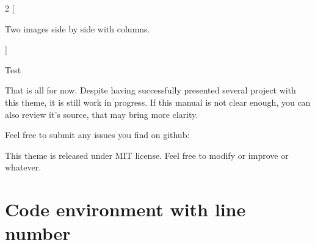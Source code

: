 \documentclass[aspectratio=1610,dvipsnames, noamsthm]{beamer}
\begin{document}
\usePrimaryDeepPurple
\useAccentYellow


\begin{frame}
  \begin{multicols}{2}
    [
      \begin{cardTiny}
        Two images side by side with columns.
      \end{cardTiny}
    ]
    \centering

  \end{multicols}
\end{frame}







\usePrimaryGrey
\useAccentDeepPurple


\begin{frame}{Test}
  \begin{card}
    That is all for now. Despite having successfully presented several project with this theme, it is still work in progress. If this manual is not clear enough, you can also review it's source, that may bring more clarity.
  \end{card}
  \begin{card}
    Feel free to submit any issues you find on github: \\
    {\footnotesize {}}
  \end{card}
  \begin{card}
    This theme is released under MIT license. Feel free to modify or improve or whatever.
  \end{card}
\end{frame}




\usePrimaryDeepOrange
\useAccentGrey


\section{Code environment with line number}
\begin{frame}[fragile]{\secname}
\end{frame}
\end{document}
